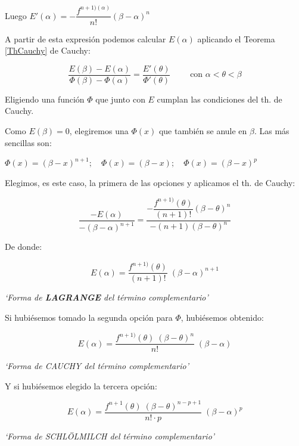 	
	Luego  $E'(\alpha)=-\dfrac {f^{n+1)(\alpha)}}{n!}(\beta-\alpha)^n$
	
	A partir de esta expresión podemos calcular $E(\alpha)$ aplicando el Teorema \ref{ThCauchy} de Cauchy:
	
	\begin{equation*}
		\dfrac {E(\beta)-E(\alpha)}{\Phi(\beta)-\Phi(\alpha)}=\dfrac {E'(\theta)}{\Phi'(\theta)} \qquad \mbox{ con } \alpha<\theta<\beta
	\end{equation*}
	
	Eligiendo una función $\Phi$ que junto con $E$ cumplan las condiciones del th. de Cauchy.
	
	Como $E(\beta)=0$, elegiremos una $\Phi(x)$ que también se anule en $\beta$. Las más sencillas son: 
	
	$\Phi(x)= (\beta-x)^{n+1}; \quad \Phi(x)= (\beta-x); \quad \Phi(x)= (\beta-x)^p$
	
	Elegimos, es este caso, la primera de las opciones y aplicamos el th. de Cauchy:
	
	\begin{equation*}
		\dfrac{-E(\alpha)}{-(\beta-\alpha)^{n+1}}=\dfrac {-\dfrac {f^{n+1)}(\theta)}{(n+1)!}(\beta-\theta)^n}{-(n+1)(\beta-\theta)^n}
	\end{equation*} 
	
	
	De donde:
	
	\begin{equation}
		E(\alpha)= \dfrac {f^{n+1)}(\theta)}{(n+1)!}\; (\beta-\alpha)^{n+1}
	\end{equation}
	\centerline{\emph{`Forma de \textbf{LAGRANGE} del término complementario'}} 
	\vspace{1mm}
	
	
	Si hubiésemos tomado la segunda opción para $\Phi$, hubiésemos obtenido:
	
	\begin{equation*}
		E(\alpha)=\dfrac {f^{n+1)}(\theta)\; (\beta-\theta)^n}{n!}\; (\beta-\alpha)
	\end{equation*}
	\centerline{\emph{`Forma de CAUCHY del término complementario'}} 
	\vspace{1mm}
	
	Y si hubiésemos elegido la tercera opción:
	
	\begin{equation*}
		E(\alpha)=\dfrac {f^{n+1}(\theta)\; (\beta-\theta)^{n-p+1}}{n! \cdot p}\; (\beta - \alpha)^p
	\end{equation*}
	\centerline{\emph{`Forma de SCHLÖLMILCH del término complementario'}} 
	\vspace{1mm}
	
